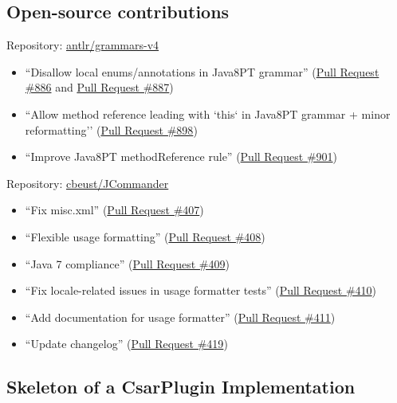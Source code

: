 \documentclass[12pt, letterpaper]{article}
\begin{document}
\subsection{Open-source contributions}
\label{apx:OpenSourceContributions}
Repository: \href{https://github.com/antlr/grammars-v4}{antlr/grammars-v4}
\begin{itemize}
  \item ``Disallow local enums/annotations in Java8PT grammar'' (\href{https://github.com/antlr/grammars-v4/pull/886}{Pull Request \#886} and \href{https://github.com/antlr/grammars-v4/pull/887}{Pull Request \#887})
  \item ``Allow method reference leading with `this` in Java8PT grammar + minor reformatting'' (\href{https://github.com/antlr/grammars-v4/pull/898}{Pull Request \#898})
  \item ``Improve Java8PT methodReference rule'' (\href{https://github.com/antlr/grammars-v4/pull/901}{Pull Request \#901})
\end{itemize}

Repository: \href{https://github.com/cbeust/jcommander}{cbeust/JCommander}
\begin{itemize}
  \item ``Fix misc.xml'' (\href{https://github.com/cbeust/jcommander/pull/407}{Pull Request \#407})
  \item ``Flexible usage formatting'' (\href{https://github.com/cbeust/jcommander/pull/408}{Pull Request \#408})
  \item ``Java 7 compliance'' (\href{https://github.com/cbeust/jcommander/pull/409}{Pull Request \#409})
  \item ``Fix locale-related issues in usage formatter tests'' (\href{https://github.com/cbeust/jcommander/pull/410}{Pull Request \#410})
  \item ``Add documentation for usage formatter'' (\href{https://github.com/cbeust/jcommander/pull/411}{Pull Request \#411})
  \item ``Update changelog'' (\href{https://github.com/cbeust/jcommander/pull/419}{Pull Request \#419})
\end{itemize}

\subsection{Skeleton of a CsarPlugin Implementation}
\label{apx:SkeletonCsarPluginImplementation}
\end{document}
